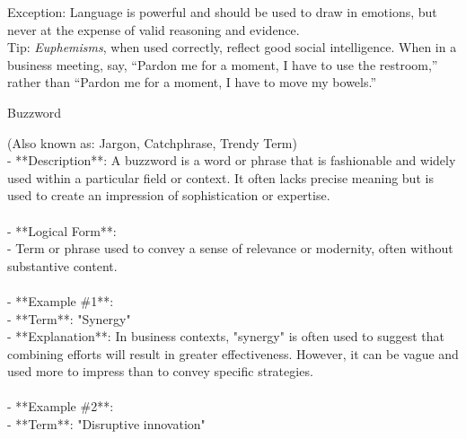 \documentclass[a4paper,12pt,single,pdftex]{scrbook}
\begin{document}
{    
      Exception: Language is powerful and should be used to draw in emotions, but never at the expense of valid reasoning and evidence.
    \\

    
      Tip: {\em Euphemisms}, when used correctly, reflect good social intelligence. When in a business meeting, say, “Pardon me for a moment, I have to use the restroom,” rather than “Pardon me for a moment, I have to move my bowels.”
    \\

  }


Buzzword
    
      (Also known as: Jargon, Catchphrase, Trendy Term)
    \\

  
    
      - **Description**: A buzzword is a word or phrase that is fashionable and widely used within a particular field or context. It often lacks precise meaning but is used to create an impression of sophistication or expertise.
    \\

    
      
    \\

    
      - **Logical Form**:
    \\

    
        - Term or phrase used to convey a sense of relevance or modernity, often without substantive content.
    \\

    
      
    \\

    
      - **Example \#1**:
    \\

    
        - **Term**: "Synergy"
    \\

    
        - **Explanation**: In business contexts, "synergy" is often used to suggest that combining efforts will result in greater effectiveness. However, it can be vague and used more to impress than to convey specific strategies.
    \\

    
      
    \\

    
      - **Example \#2**:
    \\

    
        - **Term**: "Disruptive innovation"
    \\
\end{document}
